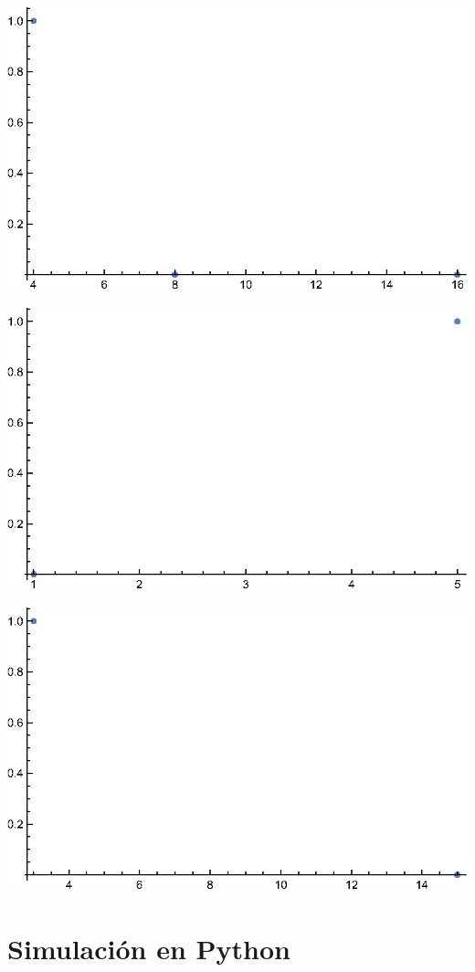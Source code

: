 \includegraphics{img/Shor_gr2.eps}

\includegraphics{img/Shor_gr3.eps}

\includegraphics{img/Shor_gr4.eps}

\section{Simulación en Python}

